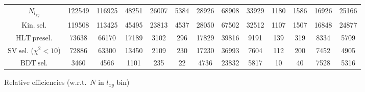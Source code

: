 \documentclass[10pt,a4paper]{article}
\begin{document}
\begin{landscape}
{\begin{tabular}{c|cccc|cccc|cccc}
\midrule
$N_{l_{xy}}$ & 122549 & 116925 & 48251 & 26007 & 5384 & 28926 & 68908 & 33929 & 1180 & 1586 & 16926 & 25166\\
$\mathrm{Kin.\ sel.}$ & 119508 & 113425 & 45495 & 23813 & 4537 & 28050 & 67502 & 32512 & 1107 & 1507 & 16848 & 24877\\
$\mathrm{HLT\ presel.}$ & 73638 & 66170 & 17189 & 3102 & 296 & 17829 & 39816 & 9191 & 139 & 319 & 8334 & 5709\\
$\mathrm{SV\ sel.}$ ($\chi^2{<}10$) & 72886 & 63300 & 13450 & 2109 & 230 & 17230 & 36993 & 7604 & 112 & 200 & 7452 & 4905\\
$\mathrm{BDT\ sel.}$ & 3460 & 4566 & 1101 & 235 & 22 & 4736 & 23832 & 5817 & 10 & 40 & 7528 & 5316\\
\bottomrule
\end{tabular}}

\vspace{18pt}

Relative efficiencies (w.r.t.\ $N$ in $l_{xy}$ bin)


\end{landscape}
\end{document}
